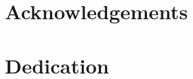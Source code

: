 \documentclass[letterpaper,12pt]{memoir} %
\begin{document}
\newpage
\chapter*{Acknowledgements} %
\newpage
\chapter*{Dedication} %



\mainmatter




\backmatter

\SingleSpacing %
\printbibliography %

\DoubleSpacing %

\end{document}
